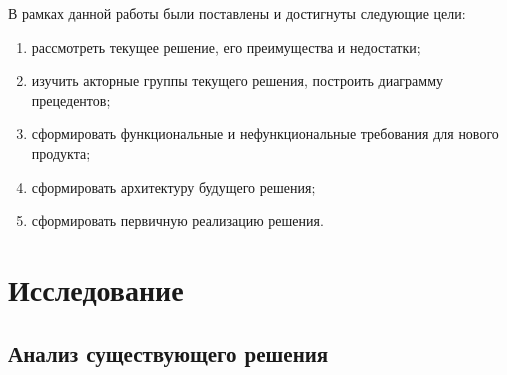 \documentclass[times,numbers=noenddot]{itmo-student-thesis}
\begin{document}
В рамках данной работы были поставлены и достигнуты следующие цели:

\begin{enumerate}[label=\arabic*.]
	\item рассмотреть текущее решение, его преимущества и недостатки;
	\item изучить акторные группы текущего решения, построить диаграмму прецедентов;
	\item сформировать функциональные и нефункциональные требования для нового продукта;
	\item сформировать архитектуру будущего решения;
	\item сформировать первичную реализацию решения.
\end{enumerate}

\leftalignedtrue
\chapter{Исследование}
\leftalignedfalse

\section{Анализ существующего решения}\label{sec:analyze_existing}
\end{document}
